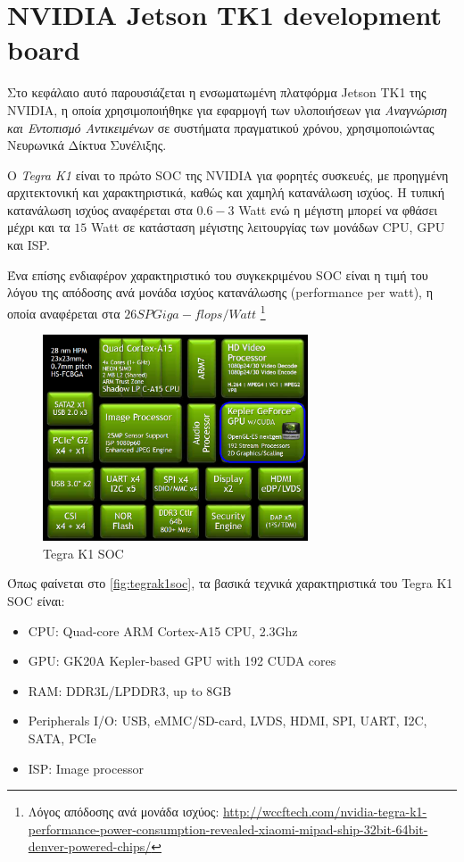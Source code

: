\section{NVIDIA Jetson TK1 development board}
\label{sec:jetson_tk1}

Στο κεφάλαιο αυτό παρουσιάζεται η ενσωματωμένη πλατφόρμα Jetson TK1 της NVIDIA,
η οποία χρησιμοποιήθηκε για εφαρμογή των υλοποιήσεων για
\emph{Αναγνώριση και Εντοπισμό Αντικειμένων} σε συστήματα πραγματικού χρόνου,
χρησιμοποιώντας Νευρωνικά Δίκτυα Συνέλιξης.

Ο \emph{Tegra K1} είναι το πρώτο SOC της NVIDIA για φορητές συσκευές, με προηγμένη αρχιτεκτονική
και χαρακτηριστικά, καθώς και χαμηλή κατανάλωση ισχύος. Η τυπική κατανάλωση
ισχύος αναφέρεται στα $0.6 - 3$ Watt ενώ η μέγιστη μπορεί να φθάσει μέχρι και τα
$15$ Watt σε κατάσταση μέγιστης λειτουργίας των μονάδων CPU, GPU και ISP.

Ένα επίσης ενδιαφέρον χαρακτηριστικό του συγκεκριμένου SOC είναι η τιμή του
λόγου της απόδοσης ανά μονάδα ισχύος κατανάλωσης (performance per watt),
η οποία αναφέρεται στα $26SP Giga-flops/Watt$
\footnote{Λόγος απόδοσης ανά μονάδα ισχύος: \url{http://wccftech.com/nvidia-tegra-k1-performance-power-consumption-revealed-xiaomi-mipad-ship-32bit-64bit-denver-powered-chips/}}


\begin{figure}[!ht]
  \centering
  \includegraphics[width=0.7\textwidth]{./images/chapter4/nvidia_tegrak1_block2.jpg}
  \caption{Tegra K1 SOC}
  \label{fig:tegrak1soc}
\end{figure}
\noindent

Όπως φαίνεται στο \autoref{fig:tegrak1soc}, τα βασικά τεχνικά χαρακτηριστικά του Tegra K1 SOC είναι:
\begin{itemize}
  \item{CPU: Quad-core ARM Cortex-A15 CPU, 2.3Ghz}
  \item{GPU: GK20A Kepler-based GPU with 192 CUDA cores}
  \item{RAM: DDR3L/LPDDR3, up to 8GB}
  \item{Peripherals I/O: USB, eMMC/SD-card, LVDS, HDMI, SPI, UART, I2C, SATA, PCIe}
  \item{ISP: Image processor}
\end{itemize}

